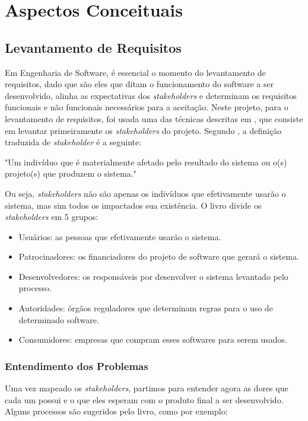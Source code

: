 \chapter{Aspectos Conceituais}
\section{Levantamento de Requisitos}
Em Engenharia de Software, é essencial o momento do levantamento de requisitos, dado que são eles que ditam o funcionamento do software a ser desenvolvido, alinha as expectativas dos \textit{stakeholders} e determinam os requisitos funcionais e não funcionais necessários para a aceitação. Neste projeto, para o levantamento de requisitos, foi usada uma das técnicas descritas em \cite{kurtbittnerianspence2002}, que consiste em levantar primeiramente os \textit{stakeholders} do projeto. Segundo \cite{kurtbittnerianspence2002}, a definição traduzida de \textit{stakeholder} é a seguinte:

\begin{citacaoLonga}
"Um indivíduo que é materialmente afetado pelo resultado do
sistema ou o(s) projeto(s) que produzem o sistema."
\end{citacaoLonga}

Ou seja, \textit{stakeholders} não são apenas os indivíduos que efetivamente usarão o sistema, mas sim todos os impactados sua existência. O livro divide os \textit{stakeholders} em 5 grupos:

\begin{itemize}
    \item Usuários: as pessoas que efetivamente usarão o sistema.
    \item Patrocinadores: os financiadores do projeto de software que gerará o sistema.
    \item Desenvolvedores: os responsáveis por desenvolver o sistema levantado pelo processo.
    \item Autoridades: órgãos reguladores que determinam regras para o uso de determinado software.
    \item Consumidores: empresas que compram esses softwares para serem usados.
\end{itemize}

\subsection{Entendimento dos Problemas}

Uma vez mapeado os \textit{stakeholders}, partimos para entender agora as dores que cada um possui e o que eles esperam com o produto final a ser desenvolvido. Alguns processos são sugeridos pelo livro\cite{kurtbittnerianspence2002}, como por exemplo:

